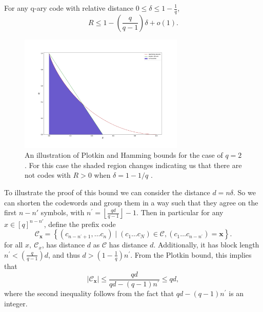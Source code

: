 \begin{definition}
For any q-ary code with relative distance $0 \leq \delta \leq 1-\frac{1}{q}$,
\begin{equation}
R \leq 1-\left(\frac{q}{q-1}\right) \delta+o(1).
\label{CH2:Plotkin_bound}
\end{equation}
\end{definition}

\begin{figure}
\centering
\includegraphics[width=0.7\textwidth]{Figures/Hamming_plotkin_bound.png}
\caption{An illustration of Plotkin and Hamming bounds for the case of $q=2$.  For this case the shaded region changes indicating us that there are not codes with $R>0$ when $\delta=1-1/q$ .}
\end{figure}

\indent To illustrate the proof of this bound we can consider the distance $d=n\delta$. So we can shorten the codewords and group them in a way such that they agree on the first $n-n'$ symbols, with $n^{\prime}=\left\lfloor\frac{q d}{q-1}\right\rfloor-1$. Then in particular for any $x\in [q]^{n-n'}$, define the prefix code
\begin{equation}
\mathcal{C}_{\mathbf{x}}=\left\{\left(c_{n-n^{\prime}+1}, \ldots c_{n}\right) \mid\left(c_{1} \ldots c_{N}\right) \in \mathcal{C},\left(c_{1} \ldots c_{n-n^{\prime}}\right)=\mathbf{x}\right\}.
\end{equation}
for all $x,\ \mathcal{C}_{x}$, has distance $d$ as $\mathcal{C}$ has distance $d$. Additionally, it has block length $n^{\prime}<\left(\frac{q}{q-1}\right) d$, and thus $d>\left(1-\frac{1}{q}\right) n^{\prime}$. From the Plotkin bound, this implies that
\begin{equation}
\left|\mathcal{C}_{\mathbf{x}}\right| \leq \frac{q d}{q d-(q-1) n^{\prime}} \leq q d,
\end{equation}
where the second inequality follows from the fact that $q d-(q-1) n^{\prime}$ is an integer.\\


